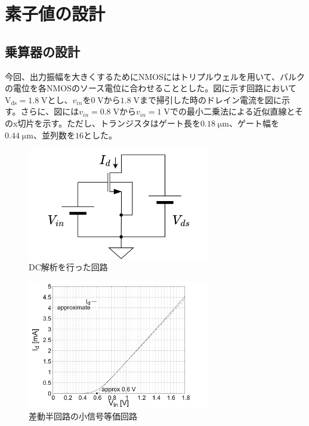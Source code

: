 \documentclass[twocolumn]{jsarticle}
\begin{document}
\section{素子値の設計}
    \subsection{乗算器の設計}
    今回、出力振幅を大きくするためにNMOSにはトリプルウェルを用いて、バルクの電位を各NMOSのソース電位に合わせることとした。図に示す回路において$\mathrm{V_{ds}}=1.8\;\mathrm{V}$とし、$v_{in}$を$0\;\mathrm{V}$から$1.8\;\mathrm{V}$まで掃引した時のドレイン電流を図に示す。さらに、図には$v_{in}=0.8\;\mathrm{V}$から$v_{in}=1\;\mathrm{V}$での最小二乗法による近似直線とそのx切片を示す。ただし、トランジスタはゲート長を$0.18\;\mathrm{\mu m}$、ゲート幅を$0.44\;\mathrm{\mu m}$、並列数を$16$とした。
    \begin{figure}[H]
        \begin{center}
            \includegraphics*[width = 80mm]{figures/nmos_unit_circuit.png}
            \caption{DC解析を行った回路}
            \label{fig:nmos_unit_circuit}
        \end{center}
    \end{figure}
    \begin{figure}[H]
        \begin{center}
            \includegraphics*[width = 80mm]{figures/nmos_unit.PNG}
            \caption{差動半回路の小信号等価回路}
            \label{fig:nmos_unit}
        \end{center}
    \end{figure}
\end{document}
